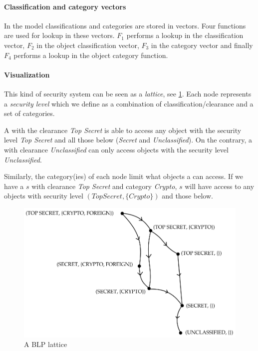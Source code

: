 \paragraph{Classification and category vectors}
 In the model classifications and categories are stored in vectors.
 Four functions are used for lookup in these vectors.
 $F_1$ performs a lookup in the \ssubject{} classification vector, $F_2$ in the object classification vector, $F_3$ in the \ssubject{} category vector and finally $F_4$ performs a lookup in the object category function.

\paragraph{Visualization}
This kind of security system can be seen as a \textit{lattice}, see \cref{blp:lattice}.
Each node represents a \emph{security level} which we define as a combination of classification/clearance and a set of categories.

A \ssubject{} with the clearance \emph{Top Secret} is able to access any object with the security level \emph{Top Secret} and all those below (\emph{Secret} and \emph{Unclassified}).
On the contrary, a \ssubject{} with clearance \emph{Unclassified} can only access objects with the security level \emph{Unclassified}.

Similarly, the category(ies) of each node limit what objects a \ssubject{} can access.
If we have a \ssubject{} $s$ with clearance \emph{Top Secret} and category \emph{Crypto}, $s$ will have access to any objects with security level $(Top Secret, \{Crypto\})$ and those below.

\begin{figure}
\centering
\includegraphics[width=\textwidth]{figures/blp_lattice}
\caption{A BLP lattice \cite{security_engineering_ross_anderson}}
\label{blp:lattice}
\end{figure}

